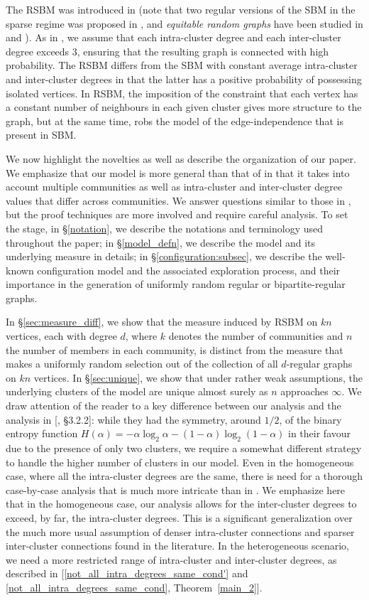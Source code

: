 \documentclass[11pt,reqno]{amsart}
\theoremstyle{definition}
\theoremstyle{remark}
\theoremstyle{conjecture}
\begin{document}
The RSBM was introduced in \cite{09} (note that two regular versions of the SBM in the sparse regime was proposed in \cite{mossel_1}, and \emph{equitable random graphs} have been studied in \cite{newman_martin} and \cite{barucca}). As in \cite{09}, we assume that each intra-cluster degree and each inter-cluster degree exceeds 3, ensuring that the resulting graph is connected with high probability. The RSBM differs from the SBM with constant average intra-cluster and inter-cluster degrees in that the latter has a positive probability of possessing isolated vertices. In RSBM, the imposition of the constraint that each vertex has a constant number of neighbours in each given cluster gives more structure to the graph, but at the same time, robs the model of the edge-independence that is present in SBM. 

We now highlight the novelties as well as describe the organization of our paper. We emphasize that our model is more general than that of \cite{09} in that it takes into account multiple communities as well as intra-cluster and inter-cluster degree values that differ across communities. We answer questions similar to those in \cite{09}, but the proof techniques are more involved and require careful analysis. To set the stage, in \S\ref{notation}, we describe the notations and terminology used throughout the paper; in \S\ref{model_defn}, we describe the model and its underlying measure in details; in \S\ref{configuration:subsec}, we describe the well-known configuration model and the associated exploration process, and their importance in the generation of uniformly random regular or bipartite-regular graphs. 

In \S\ref{sec:measure_diff}, we show that the measure induced by RSBM on $k n$ vertices, each with degree $d$, where $k$ denotes the number of communities and $n$ the number of members in each community, is distinct from the measure that makes a uniformly random selection out of the collection of all $d$-regular graphs on $k n$ vertices. In \S\ref{sec:unique}, we show that under rather weak assumptions, the underlying clusters of the model are unique almost surely as $n$ approaches $\infty$. We draw attention of the reader to a key difference between our analysis and the analysis in [\cite{09}, \S 3.2.2]: while they had the symmetry, around $1/2$, of the binary entropy function $H(\alpha) = -\alpha \log_{2} \alpha - (1-\alpha) \log_{2} (1-\alpha)$ in their favour due to the presence of only two clusters, we require a somewhat different strategy to handle the higher number of clusters in our model. Even in the homogeneous case, where all the intra-cluster degrees are the same, there is need for a thorough case-by-case analysis that is much more intricate than in \cite{09}. We emphasize here that in the homogeneous case, our analysis allows for the inter-cluster degrees to exceed, by far, the intra-cluster degrees. This is a significant generalization over the much more usual assumption of denser intra-cluster connections and sparser inter-cluster connections found in the literature. In the heterogeneous scenario, we need a more restricted range of intra-cluster and inter-cluster degrees, as described in [\eqref{not_all_intra_degrees_same_cond'} and \eqref{not_all_intra_degrees_same_cond}, Theorem~\ref{main_2}]. 
\end{document}
